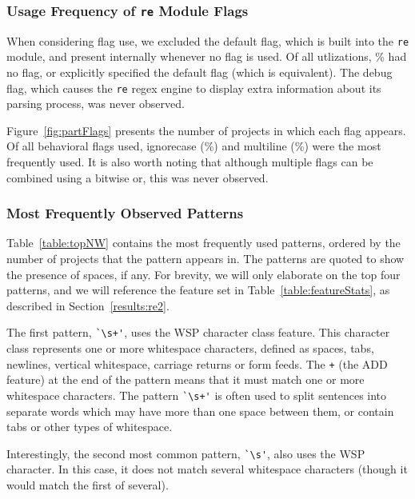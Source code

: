 \subsubsection{Usage Frequency of {\tt re} Module Flags}
When considering flag use, we excluded the default flag, which is built into the {\tt re} module, and present internally whenever no flag is used.  Of all utlizations, \% had no flag, or explicitly specified the default flag (which is equivalent).  The debug flag, which causes the {\tt re} regex engine to display extra information about its parsing process, was never observed. 

 Figure~\ref{fig:partFlags} presents the number of projects in which each flag appears.  Of all behavioral flags used, ignorecase (\%) and multiline (\%) were the most frequently used.  It is also worth noting that although multiple flags can be combined using a bitwise or, this was never observed.


\subsubsection{Most Frequently Observed Patterns}

Table~\ref{table:topNW} contains the most frequently used patterns, ordered by the number of projects that the pattern appears in.  The patterns are quoted to show the presence of spaces, if any.  For brevity, we will only elaborate on the top four patterns, and we will reference the feature set in Table~\ref{table:featureStats}, as described in Section~\ref{results:re2}.

The first pattern, \verb!`\s+'!, uses the WSP character class feature.  This character class represents one or more whitespace characters,  defined as spaces, tabs, newlines, vertical whitespace, carriage returns or form feeds.  The \verb!+! (the ADD feature) at the end of the pattern means that it must match one or more whitespace characters.  The pattern \verb!`\s+'! is often used to split sentences into separate words which may have more than one space between them, or contain tabs or other types of whitespace.

Interestingly, the second most common pattern, \verb!`\s'!, also uses the WSP character. In this case, it does not match several whitespace characters (though it would match the first of several).

